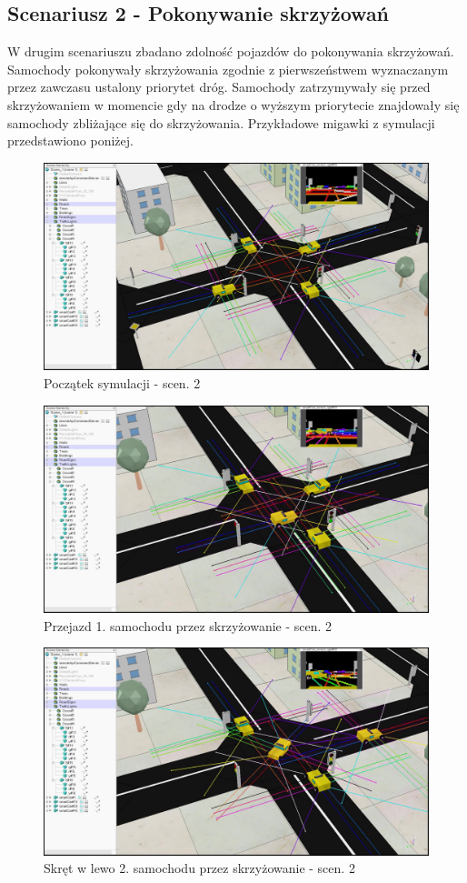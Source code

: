 \subsection{Scenariusz 2 - Pokonywanie skrzyżowań}

W drugim scenariuszu zbadano zdolność pojazdów do pokonywania skrzyżowań. Samochody pokonywały skrzyżowania zgodnie z pierwszeństwem wyznaczanym przez zawczasu ustalony priorytet dróg. Samochody zatrzymywały się przed skrzyżowaniem w momencie gdy na drodze o wyższym priorytecie znajdowały się samochody zbliżające się do skrzyżowania. Przykładowe migawki z symulacji przedstawiono poniżej.

\begin{figure}[!h]
	\centering
	\centering
	\includegraphics[width=.8\linewidth]{p21.jpg}
	\caption{Początek symulacji - scen. 2}
	\label{fig:p21}
\end{figure}

\begin{figure}[!h]
	\centering
	\centering
	\includegraphics[width=.8\linewidth]{p22.jpg}
	\caption{Przejazd 1. samochodu przez skrzyżowanie - scen. 2}
	\label{fig:p22}
\end{figure}

\begin{figure}[!h]
	\centering
	\centering
	\includegraphics[width=.8\linewidth]{p23.jpg}
	\caption{Skręt w lewo 2. samochodu przez skrzyżowanie - scen. 2}
	\label{fig:p23}
\end{figure}

